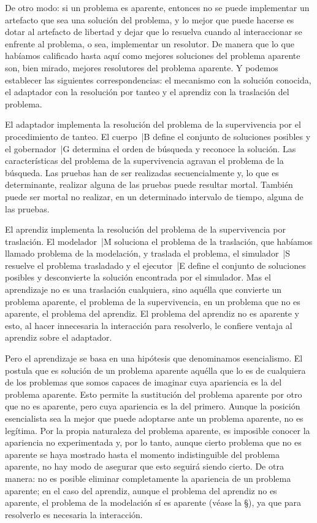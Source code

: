 De otro modo: si un problema es aparente, entonces no se puede implementar
un artefacto que sea una solución del problema, y lo mejor que puede hacerse
es dotar al artefacto de libertad y dejar que lo resuelva cuando al
interaccionar se enfrente al problema, o sea, implementar un resolutor.  De
manera que lo que habíamos calificado hasta aquí como mejores soluciones del
problema aparente son, bien mirado, mejores resolutores del problema
aparente.  Y podemos establecer las siguientes correspondencias: el
mecanismo con la solución conocida, el adaptador con la resolución por
tanteo y el aprendiz con la traslación del problema.

El adaptador implementa la resolución del problema de la supervivencia
por el procedimiento de tanteo.  El cuerpo~|B define el conjunto de
soluciones posibles y el gobernador~|G determina el orden de búsqueda y
reconoce la solución.  Las características del problema de la
supervivencia agravan el problema de la búsqueda.  Las pruebas han de ser
realizadas secuencialmente y, lo que es determinante, realizar alguna de
las pruebas puede resultar mortal.  También puede ser mortal no realizar,
en un determinado intervalo de tiempo, alguna de las pruebas.

El aprendiz implementa la resolución del problema de la supervivencia por
traslación.  El modelador~|M soluciona el problema de la traslación, que
habíamos llamado problema de la modelación, y traslada el problema, el
simulador~|S resuelve el problema trasladado y el ejecutor~|E define el
conjunto de soluciones posibles y desconvierte la solución encontrada por
el simulador.  Mas el aprendizaje no es una traslación cualquiera, sino
aquélla que convierte un problema aparente, el problema de la
supervivencia, en un problema que no es aparente, el problema del aprendiz.
El problema del aprendiz no es aparente y esto, al hacer innecesaria la
interacción para resolverlo, le confiere ventaja al aprendiz sobre el
adaptador.

\label{modelación aparente}
Pero el aprendizaje se basa en una hipótesis que denominamos esencialismo.
El  postula que es solución de un problema aparente
aquélla que lo es de cualquiera de los problemas que somos capaces de
imaginar cuya apariencia es la del problema aparente. Esto permite la
sustitución del problema aparente por otro que no es aparente, pero cuya
apariencia es la del primero.  Aunque la posición esencialista sea la mejor
que puede adoptarse ante un problema aparente, no es legítima.  Por la
propia naturaleza del problema aparente, es imposible conocer la apariencia
no experimentada y, por lo tanto, aunque cierto problema que no es aparente
se haya mostrado hasta el momento indistinguible del problema aparente, no
hay modo de asegurar que esto seguirá siendo cierto.  De otra manera: no es
posible eliminar completamente la apariencia de un problema aparente; en el
caso del aprendiz, aunque el problema del aprendiz no es aparente, el
problema de la modelación sí es aparente (véase la \S{}), ya que para resolverlo es necesaria la interacción.


